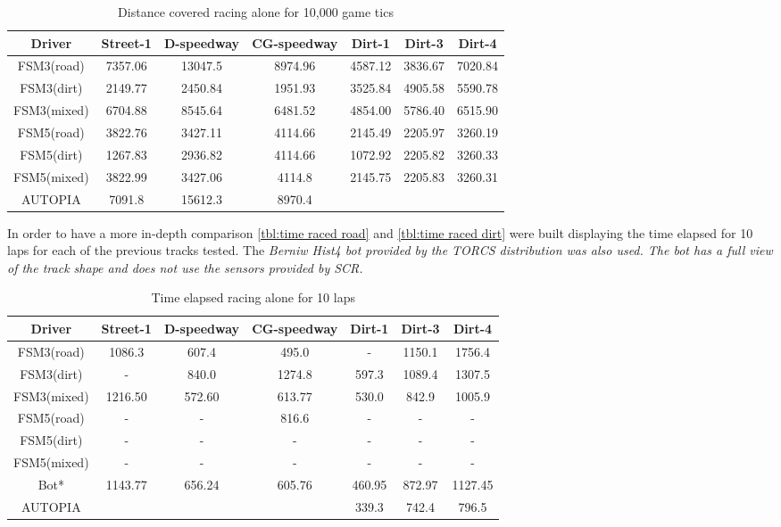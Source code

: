 	\begin{table}[h]
	\renewcommand{\arraystretch}{1.3}
	\caption{Distance covered racing alone for 10,000 game tics}
	\label{tbl:dist covered}
	\centering
	\begin{tabular}{c||c||c||c||c||c||c}
	\hline
	\bfseries Driver & \bfseries Street-1 & \bfseries D-speedway & \bfseries CG-speedway & \bfseries Dirt-1 & \bfseries Dirt-3 & \bfseries Dirt-4 \\ 
	\hline
	\hline FSM3(road) & 7357.06	& 13047.5 & 8974.96 & 4587.12 & 3836.67 & 7020.84 \\
	\hline FSM3(dirt) & 2149.77	& 2450.84 & 1951.93	& 3525.84 & 4905.58 & 5590.78 \\
	\hline FSM3(mixed) & 6704.88 & 8545.64 & 6481.52 & 4854.00 & 5786.40 & 6515.90 \\
	\hline FSM5(road) & 3822.76 & 3427.11 & 4114.66	& 2145.49 &	2205.97 & 3260.19 \\
	\hline FSM5(dirt) & 1267.83 & 2936.82 &	4114.66 & 1072.92 &	2205.82 & 3260.33 \\
	\hline FSM5(mixed) & 3822.99 & 3427.06 & 4114.8 & 2145.75 &	2205.83 & 3260.31 \\
	\hline AUTOPIA & 7091.8 & 15612.3 & 8970.4 & \toDo{?} &\toDo{?} &\toDo{?} \\
	\hline 
	\end{tabular} 
	\end{table}

	In order to have a more in-depth comparison \ref{tbl:time raced road} and \ref{tbl:time raced dirt} were built displaying the time elapsed for 10 laps for each of the previous tracks tested. The \itshape{Berniw Hist4} bot provided by the TORCS distribution was also used. 
	The bot has a full view of the track shape and does not use the sensors provided by SCR.
	
	\begin{table}[h]
	\renewcommand{\arraystretch}{1.3}
	\caption{Time elapsed racing alone for 10 laps}
	\label{tbl:time raced}
	\centering
	\begin{tabular}{c||c||c||c||c||c||c}
	\hline
	\bfseries Driver & \bfseries Street-1 & \bfseries D-speedway & \bfseries CG-speedway & \bfseries Dirt-1 & \bfseries Dirt-3 & \bfseries Dirt-4 \\ 
	\hline
	\hline FSM3(road) & 1086.3 & 607.4 & 495.0 & - & 1150.1 & 1756.4 \\
	\hline FSM3(dirt) & - & 840.0 & 1274.8 & 597.3 & 1089.4 & 1307.5 \\
	\hline FSM3(mixed) & 1216.50 & 572.60 & 613.77& 530.0 & 842.9 & 1005.9 \\
	\hline FSM5(road) & - & - & 816.6 & - &	- & - \\
	\hline FSM5(dirt) & - & - & - & - &	- & - \\
	\hline FSM5(mixed) & - & - & - & - & - & - \\
	\hline Bot* & 1143.77 & 656.24 & 605.76 & 460.95 & 872.97 & 1127.45 \\
	\hline AUTOPIA & \toDo{?} & \toDo{?} & \toDo{?} & 339.3 & 742.4 & 796.5 \\
	\hline 
	\end{tabular} 
	\end{table}
	
